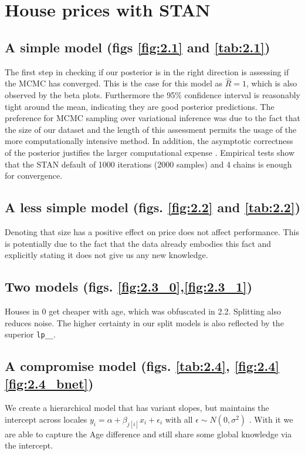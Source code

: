 \documentclass[11pt,a4paper,titlepage]{article}
\begin{document}
\section{House prices with STAN}
  \subsection{A simple model (figs \ref{fig:2.1} and \ref{tab:2.1})}
  The first step in checking if our posterior is in the right direction is assessing if the MCMC has converged. This is the case for this model as \(\hat{R} = 1\), which is also observed by the beta plots. Furthermore the 95\% confidence interval is reasonably tight around the mean, indicating they are good posterior predictions.
  The preference for MCMC sampling over variational inference was due to the fact that the size of our dataset and the length of this assessment permits the usage of the more computationally intensive method. In addition, the asymptotic correctness of the posterior justifies the larger computational expense \parencite{BleiVI}. Empirical tests show that the STAN default of 1000 iterations (2000 samples) and 4 chains is enough for convergence.

  \subsection{A less simple model (figs. \ref{fig:2.2} and \ref{tab:2.2})}
  Denoting that size has a positive effect on price does not affect performance. This is potentially due to the fact that the data already embodies this fact and explicitly stating it does not give us any new knowledge.

  \subsection{Two models (figs. \ref{fig:2.3_0},\ref{fig:2.3_1})}
  Houses in 0 get cheaper with age, which was obfuscated in 2.2. Splitting also reduces noise. The higher certainty in our split models is also reflected by the superior \texttt{lp\_\_}.

  \subsection{A compromise model (figs. \ref{tab:2.4}, \ref{fig:2.4} \ref{fig:2.4_bnet})}
  We create a hierarchical model \parencite{MultilevelHM} that has variant slopes, but maintains the intercept across locales \(y_i = \alpha + \beta_{j[i]} x_i + \epsilon_i \) with all \(\epsilon \sim N(0,\sigma^{2})\) \parencite{VaryingAlpha}. With it we are able to capture the Age difference and still share some global knowledge via the intercept.
\end{document}
